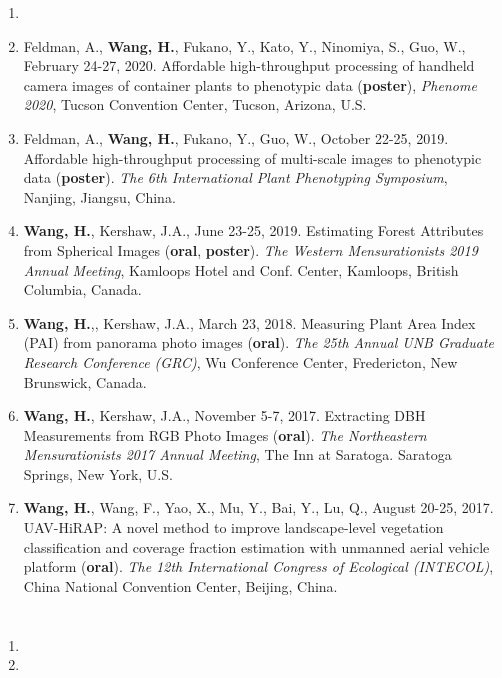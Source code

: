 \begin{singlespace}
\begin{enumerate}
  \item {}
  \item Feldman, A., \textbf{Wang, H.}, Fukano, Y., Kato, Y., Ninomiya, S., Guo, W., February 24-27, 2020. Affordable high-throughput processing of handheld camera images of container plants to phenotypic data (\textbf{poster}), \textit{Phenome 2020}, Tucson Convention Center, Tucson, Arizona, U.S.
  \item Feldman, A., \textbf{Wang, H.}, Fukano, Y., Guo, W., October 22-25, 2019. Affordable high-throughput processing of multi-scale images to phenotypic data (\textbf{poster}). \textit{The 6th International Plant Phenotyping Symposium}, Nanjing, Jiangsu, China.
  \item \textbf{Wang, H.}, Kershaw, J.A., June 23-25, 2019. Estimating Forest Attributes from Spherical Images (\textbf{oral}, \textbf{poster}). \textit{The Western Mensurationists 2019 Annual Meeting}, Kamloops Hotel and Conf. Center, Kamloops, British Columbia, Canada.
  \item \textbf{Wang, H.},, Kershaw, J.A., March 23, 2018. Measuring Plant Area Index (PAI) from panorama photo images (\textbf{oral}). \textit{The 25th Annual UNB Graduate Research Conference (GRC)}, Wu Conference Center, Fredericton, New Brunswick, Canada.
  \item \textbf{Wang, H.}, Kershaw, J.A., November 5-7, 2017. Extracting DBH Measurements from RGB Photo Images (\textbf{oral}). \textit{The Northeastern Mensurationists 2017 Annual Meeting}, The Inn at Saratoga. Saratoga Springs, New York, U.S.
  \item \textbf{Wang, H.}, Wang, F., Yao, X., Mu, Y., Bai, Y., Lu, Q., August 20-25, 2017. UAV-HiRAP: A novel method to improve landscape-level vegetation classification and coverage fraction estimation with unmanned aerial vehicle platform (\textbf{oral}). \textit{The 12th International Congress of Ecological (INTECOL)}, China National Convention Center, Beijing, China.
\end{enumerate}


\section*{}
\begin{enumerate}
  \item {}
  \item {}
\end{enumerate}



\end{singlespace}
